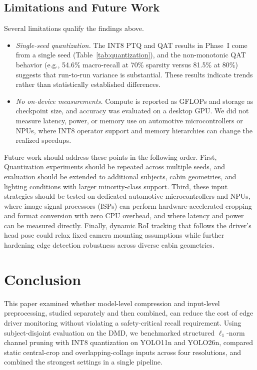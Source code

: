 \documentclass[conference]{IEEEtran}
\begin{document}
\begin{itemize}
\subsection{Limitations and Future Work}
\label{sec:limitations}
Several limitations qualify the findings above.
\begin{itemize}
    \item \emph{Single-seed quantization.} The INT8 PTQ and QAT results in Phase~I come from a single seed (Table~\ref{tab:quantization}), and the non-monotonic QAT behavior (e.g., 54.6\% macro-recall at 70\% sparsity versus 81.5\% at 80\%) suggests that run-to-run variance is substantial. These results indicate trends rather than statistically established differences.
    \item \emph{No on-device measurements.} Compute is reported as GFLOPs and storage as checkpoint size, and accuracy was evaluated on a desktop GPU. We did not measure latency, power, or memory use on automotive microcontrollers or NPUs, where INT8 operator support and memory hierarchies can change the realized speedups.
\end{itemize}

Future work should address these points in the following order. First, Quantization experiments should be repeated across multiple seeds, and evaluation should be extended to additional subjects, cabin geometries, and lighting conditions with larger minority-class support. Third, these input strategies should be tested on dedicated automotive microcontrollers and NPUs, where image signal processors (ISPs) can perform hardware-accelerated cropping and format conversion with zero CPU overhead, and where latency and power can be measured directly. Finally, dynamic RoI tracking that follows the driver's head pose could relax fixed camera mounting assumptions while further hardening edge detection robustness across diverse cabin geometries.
\end{itemize}

\section{Conclusion}
This paper examined whether model-level compression and input-level preprocessing, studied separately and then combined, can reduce the cost of edge driver monitoring without violating a safety-critical recall requirement. Using subject-disjoint evaluation on the DMD, we benchmarked structured $\ell_1$-norm channel pruning with INT8 quantization on YOLO11n and YOLO26n, compared static central-crop and overlapping-collage inputs across four resolutions, and combined the strongest settings in a single pipeline.
\end{document}
